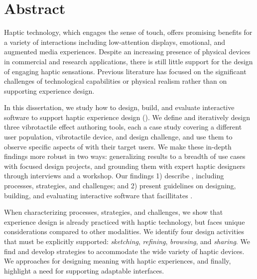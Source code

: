 
\chapter{Abstract}

Haptic technology, which engages the sense of touch, offers promising benefits for a variety of interactions including low-attention displays, emotional, and augmented media experiences.
Despite %
an increasing presence of physical devices in commercial and research applications, there is still little support for the design of engaging haptic sensations.
Previous literature has focused on the significant challenges of technological capabilities or physical realism rather than on supporting experience design. %

In this dissertation, we study how to design, build, and evaluate interactive software to support haptic experience design (\haxd).
We define \haxd and iteratively design three vibrotactile effect authoring tools, each a case study covering a different user population, vibrotactile device, and design challenge, and use them to observe specific aspects of \haxd with their target users.
We make these in-depth findings more robust in two ways: generalizing results to a breadth of use cases with focused design projects, and grounding them with expert haptic designers through interviews and a workshop.
Our findings 1) describe \haxd, including processes, strategies, and challenges; and 2) present guidelines on designing, building, and evaluating interactive software that facillitates \haxd.

When characterizing \haxd processes, strategies, and challenges, 
we show that experience design is already practiced with haptic technology, but faces unique considerations compared to other modalities. 
We identify four design activities that must be explicitly supported: \emph{sketching}, \emph{refining}, \emph{browsing}, and \emph{sharing}.
We find and develop strategies to accommodate the wide variety of haptic devices.
We  %
approaches for designing meaning with haptic experiences, and finally, highlight a need for supporting adaptable interfaces.


